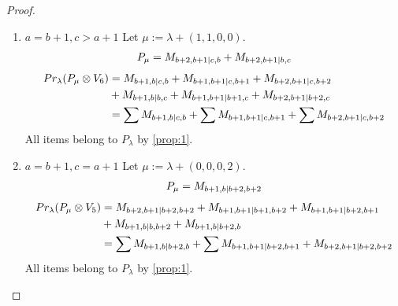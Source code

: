 \documentclass[12pt,a4paper]{article}
\begin{document}
\begin{proof}
\begin{enumerate}
\begin{enumerate}
    \item $a=b+1, c>a+1$
        Let $\mu:=\lambda + (1,1,0,0) $. 
\begin{equation}\notag
  \begin{aligned}
      P_{\mu} =
M_{b+2,b+1|c,b}
+M_{b+2,b+1|b,c}
  \end{aligned}
\end{equation}
\begin{equation}\notag
  \begin{aligned}
    Pr_{\lambda}(P_\mu \otimes V_6) &=
M_{b+1,b|c,b}
+M_{b+1,b+1|c,b+1}
+M_{b+2,b+1|c,b+2} \\
                                    &+
M_{b+1,b|b,c}
+M_{b+1,b+1|b+1,c}
+M_{b+2,b+1|b+2,c}\\
                                    &=
\sum M_{b+1,b|c,b}
+\sum M_{b+1,b+1|c,b+1}
+\sum M_{b+2,b+1|c,b+2}
  \end{aligned}
\end{equation}
All items belong to $P_\lambda$ by \cref{prop:1}.

    \item $a=b+1, c=a+1$
        Let $\mu:=\lambda + (0,0,0,2) $. 
\begin{equation}\notag
  \begin{aligned}
      P_{\mu} =
M_{b+1,b|b+2,b+2}
  \end{aligned}
\end{equation}
\begin{equation}\notag
  \begin{aligned}
    Pr_{\lambda}(P_\mu \otimes V_5) &=
M_{b+2,b+1|b+2,b+2}
+M_{b+1,b+1|b+1,b+2}
+M_{b+1,b+1|b+2,b+1}  \\
                                    &+
M_{b+1,b|b,b+2}
+M_{b+1,b|b+2,b} \\
                                    &=
\sum M_{b+1,b|b+2,b}
+\sum M_{b+1,b+1|b+2,b+1}
+ M_{b+2,b+1|b+2,b+2}
  \end{aligned}
\end{equation}
All items belong to $P_\lambda$ by \cref{prop:1}.
  \end{enumerate}


\end{enumerate}
\end{proof}
\end{document}
